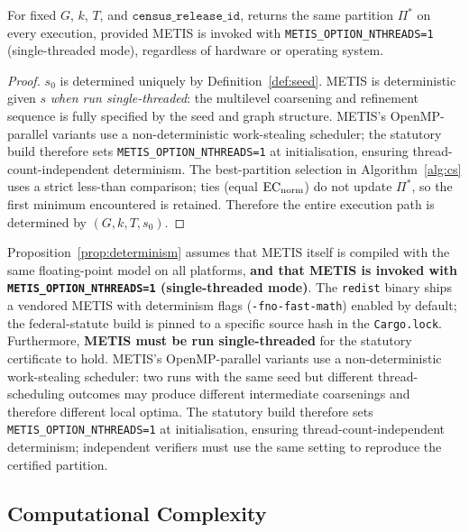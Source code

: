 \begin{proposition}[Determinism]
\label{prop:determinism}
For fixed $G$, $k$, $T$, and $\mathtt{census\_release\_id}$, \cs{} returns
the same partition $\Pi^*$ on every execution, provided METIS is invoked with
\texttt{METIS\_OPTION\_NTHREADS=1} (single-threaded mode), regardless of
hardware or operating system.
\end{proposition}

\begin{proof}
$s_0$ is determined uniquely by Definition~\ref{def:seed}.
METIS is deterministic given $s$ \emph{when run single-threaded}: the
multilevel coarsening and refinement sequence is fully specified by the seed
and graph structure.
METIS's OpenMP-parallel variants use a non-deterministic work-stealing
scheduler; the statutory build therefore sets \texttt{METIS\_OPTION\_NTHREADS=1}
at initialisation, ensuring thread-count-independent determinism.
The best-partition selection in Algorithm~\ref{alg:cs} uses a strict less-than
comparison; ties (equal $\mathrm{EC}_{\mathrm{norm}}$) do not update $\Pi^*$, so the first
minimum encountered is retained.
Therefore the entire execution path is determined by $(G, k, T, s_0)$.
\end{proof}

\begin{remark}
Proposition~\ref{prop:determinism} assumes that METIS itself is compiled with
the same floating-point model on all platforms, \textbf{and that METIS is
invoked with \texttt{METIS\_OPTION\_NTHREADS=1} (single-threaded mode)}.
The \texttt{redist} binary ships a vendored METIS with determinism flags
(\texttt{-fno-fast-math}) enabled by default; the federal-statute build is
pinned to a specific source hash in the \texttt{Cargo.lock}.
Furthermore, \textbf{METIS must be run single-threaded} for the statutory
certificate to hold.
METIS's OpenMP-parallel variants use a non-deterministic work-stealing
scheduler: two runs with the same seed but different thread-scheduling
outcomes may produce different intermediate coarsenings and therefore
different local optima.
The statutory build therefore sets \texttt{METIS\_OPTION\_NTHREADS=1} at
initialisation, ensuring thread-count-independent determinism; independent
verifiers must use the same setting to reproduce the certified partition.
\end{remark}

\subsection{Computational Complexity}

